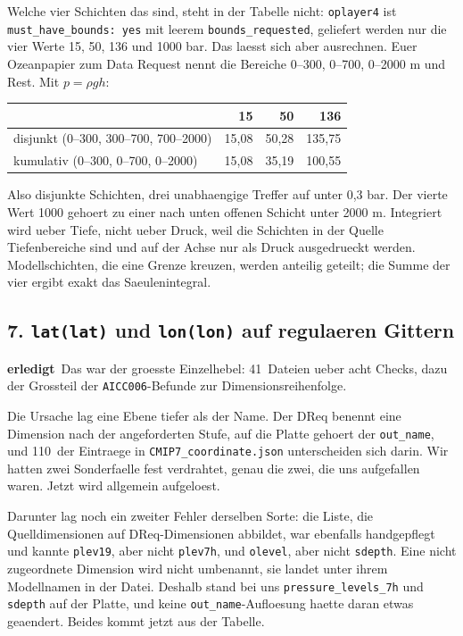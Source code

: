 \documentclass[11pt,a4paper]{article}
\newcommand{\code}[1]{\texttt{\small #1}}
\newcommand{\ok}{\textcolor{green!45!black}{\textbf{erledigt}}}
\begin{document}
Welche vier Schichten das sind, steht in der Tabelle nicht: \code{oplayer4} ist
\code{must\_have\_bounds: yes} mit leerem \code{bounds\_requested}, geliefert werden
nur die vier Werte 15, 50, 136 und 1000 bar. Das laesst sich aber ausrechnen. Euer
Ozeanpapier zum Data Request nennt die Bereiche 0--300, 0--700, 0--2000 m und Rest.
Mit $p = \rho g h$:

\begin{center}
\begin{tabular}{lrrr}
\toprule
& \textbf{15} & \textbf{50} & \textbf{136} \\
\midrule
disjunkt (0--300, 300--700, 700--2000) & 15{,}08 & 50{,}28 & 135{,}75 \\
kumulativ (0--300, 0--700, 0--2000)    & 15{,}08 & 35{,}19 & 100{,}55 \\
\bottomrule
\end{tabular}
\end{center}

Also disjunkte Schichten, drei unabhaengige Treffer auf unter 0{,}3 bar. Der vierte
Wert 1000 gehoert zu einer nach unten offenen Schicht unter 2000 m. Integriert wird
ueber Tiefe, nicht ueber Druck, weil die Schichten in der Quelle Tiefenbereiche sind
und auf der Achse nur als Druck ausgedrueckt werden. Modellschichten, die eine Grenze
kreuzen, werden anteilig geteilt; die Summe der vier ergibt exakt das
Saeulenintegral.

\subsection*{7. \code{lat(lat)} und \code{lon(lon)} auf regulaeren Gittern}
\ok\ Das war der groesste Einzelhebel: 41~Dateien ueber acht Checks, dazu der
Grossteil der \code{AICC006}-Befunde zur Dimensionsreihenfolge.

Die Ursache lag eine Ebene tiefer als der Name. Der DReq benennt eine Dimension nach
der angeforderten Stufe, auf die Platte gehoert der \code{out\_name}, und 110~der
Eintraege in \code{CMIP7\_coordinate.json} unterscheiden sich darin. Wir hatten zwei
Sonderfaelle fest verdrahtet, genau die zwei, die uns aufgefallen waren. Jetzt wird
allgemein aufgeloest.

Darunter lag noch ein zweiter Fehler derselben Sorte: die Liste, die Quelldimensionen
auf DReq-Dimensionen abbildet, war ebenfalls handgepflegt und kannte \code{plev19},
aber nicht \code{plev7h}, und \code{olevel}, aber nicht \code{sdepth}. Eine nicht
zugeordnete Dimension wird nicht umbenannt, sie landet unter ihrem Modellnamen in der
Datei. Deshalb stand bei uns \code{pressure\_levels\_7h} und \code{sdepth} auf der
Platte, und keine \code{out\_name}-Aufloesung haette daran etwas geaendert. Beides
kommt jetzt aus der Tabelle.
\end{document}
